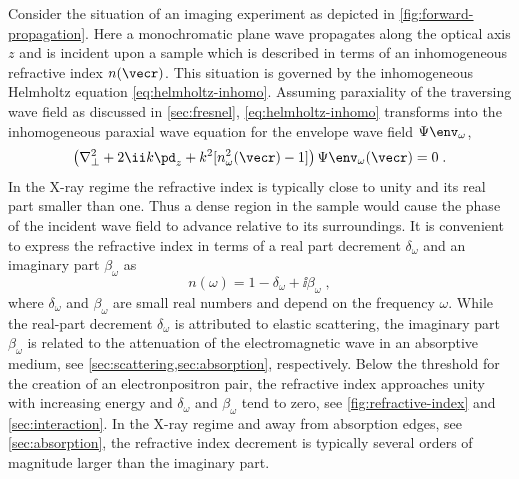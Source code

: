 \documentclass[
twoside,
openright,
titlepage,
numbers=noenddot,
headinclude,
fleqn,
a4paper,
footinclude=true,
cleardoublepage=empty,
abstractoff,
BCOR=5mm,
paper=a4,
fontsize=11pt,
british,ngerman,american,
]{scrreprt}
\begin{document}
Consider the situation of an imaging experiment as depicted in
\cref{fig:forward-propagation}.  Here a monochromatic plane wave
propagates along the optical axis $z$ and is incident upon a sample
which is described in terms of an inhomogeneous refractive index
$n(\vecr)$.  This situation is governed by the inhomogeneous Helmholtz
equation \eqref{eq:helmholtz-inhomo}.  Assuming paraxiality of the
traversing wave field as discussed in \cref{sec:fresnel},
\cref{eq:helmholtz-inhomo} transforms into the inhomogeneous paraxial
wave equation for the envelope wave field $\Psi\env_{\omega}$,
\begin{equation}
    \label{eq:pwe-inhom}
    \left(\nabla_\perp^2 + 2\ii k\pd_z + k^2[n_\omega^2(\vecr)-1]\right) 
    \Psi\env_{\omega}(\vecr)=0\;.
\end{equation}
In the X-ray regime the refractive index is typically close to unity
and its real part smaller than one.  Thus a dense region in the sample
would cause the phase of the incident wave field to advance relative
to its surroundings.  It is convenient to express the refractive index
in terms of a real part decrement $\delta_\omega$ and an imaginary
part $\beta_\omega$ as
\begin{equation}
  \label{eq:n-xray}
  n(\omega) = 1 -\delta_\omega +\ii\beta_\omega\;,
\end{equation}
where $\delta_\omega$ and $\beta_\omega$ are small real numbers and
depend on the frequency $\omega$.  While the real-part decrement
$\delta_\omega$ is attributed to elastic scattering, the imaginary
part $\beta_\omega$ is related to the attenuation of the electromagnetic
wave in an absorptive medium, see
\cref{sec:scattering,sec:absorption}, respectively.  Below the
threshold for the creation of an electron\hyph positron pair, the
refractive index approaches unity with increasing energy and 
$\delta_\omega$ and $\beta_\omega$ tend to zero, see
\cref{fig:refractive-index} and \cref{sec:interaction}.  In the X-ray
regime and away from absorption edges, see \cref{sec:absorption}, the
refractive index decrement is typically several orders of magnitude
larger than the imaginary part.
\end{document}
